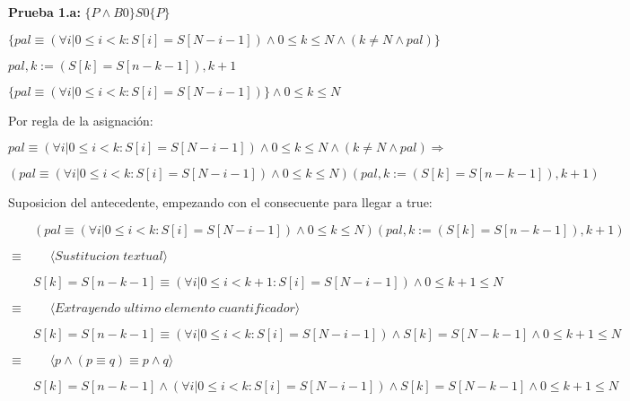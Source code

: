 \documentclass[hidelinks]{article}
\begin{document}
\vspace{1em}

\textbf{Prueba 1.a:} $\{P \land B0 \} S0 \{P\}$ \par
$\{pal \equiv (\forall i | 0 \leq i < k : S[i]=S[N-i-1]) \land 0 \leq k \leq N \land (k \neq N \land pal)\}$ \par
\hspace{0.5em} $pal, k := (S[k]=S[n-k-1]), k+1$ \par
$\{pal \equiv (\forall i | 0 \leq i < k : S[i]=S[N-i-1]) \} \land 0 \leq k \leq N$ \par

\vspace{1em}

Por regla de la asignación: \par

$pal \equiv (\forall i | 0 \leq i < k : S[i]=S[N-i-1]) \land 0 \leq k \leq N \land (k \neq N \land pal) \Rightarrow$ \par
$(pal \equiv (\forall i | 0 \leq i < k : S[i]=S[N-i-1]) \land 0 \leq k \leq N )(pal, k := (S[k]=S[n-k-1]), k+1)$ \par

\vspace{1em}

Suposicion del antecedente, empezando con el consecuente para llegar a true: \par
$\qquad (pal \equiv (\forall i | 0 \leq i < k : S[i]=S[N-i-1]) \land 0 \leq k \leq N )(pal, k := (S[k]=S[n-k-1]), k+1)$ \par

$\equiv  \qquad \langle Sustitucion \; textual \rangle$ \par

$\qquad S[k]=S[n-k-1] \equiv (\forall i | 0 \leq i < k+1 : S[i]=S[N-i-1]) \land 0 \leq k+1 \leq N$ \par

$\equiv  \qquad \langle Extrayendo \; ultimo \; elemento \; cuantificador \rangle$ \par

$\qquad S[k]=S[n-k-1] \equiv (\forall i | 0 \leq i < k : S[i]=S[N-i-1]) \land S[k]=S[N-k-1] \land 0 \leq k+1 \leq N$ \par

$\equiv  \qquad \langle p \land (p \equiv q) \equiv p \land q  \rangle$ \par

$\qquad S[k]=S[n-k-1] \land (\forall i | 0 \leq i < k : S[i]=S[N-i-1]) \land S[k]=S[N-k-1] \land 0 \leq k+1 \leq N$ \par
\end{document}
